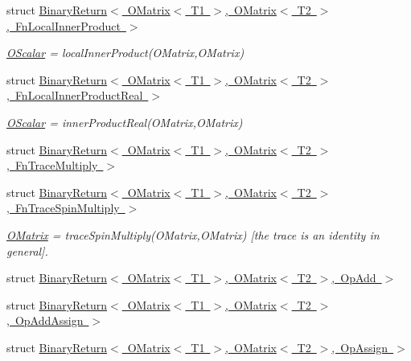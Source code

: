 \begin{DoxyCompactItemize}
struct \mbox{\hyperlink{structENSEM_1_1BinaryReturn_3_01OMatrix_3_01T1_01_4_00_01OMatrix_3_01T2_01_4_00_01FnLocalInnerProduct_01_4}{Binary\+Return$<$ O\+Matrix$<$ T1 $>$, O\+Matrix$<$ T2 $>$, Fn\+Local\+Inner\+Product $>$}}
\begin{DoxyCompactList}\small\item\em \mbox{\hyperlink{classENSEM_1_1OScalar}{O\+Scalar}} = local\+Inner\+Product(\+O\+Matrix,\+O\+Matrix) \end{DoxyCompactList}\item 
struct \mbox{\hyperlink{structENSEM_1_1BinaryReturn_3_01OMatrix_3_01T1_01_4_00_01OMatrix_3_01T2_01_4_00_01FnLocalInnerProductReal_01_4}{Binary\+Return$<$ O\+Matrix$<$ T1 $>$, O\+Matrix$<$ T2 $>$, Fn\+Local\+Inner\+Product\+Real $>$}}
\begin{DoxyCompactList}\small\item\em \mbox{\hyperlink{classENSEM_1_1OScalar}{O\+Scalar}} = inner\+Product\+Real(\+O\+Matrix,\+O\+Matrix) \end{DoxyCompactList}\item 
struct \mbox{\hyperlink{structENSEM_1_1BinaryReturn_3_01OMatrix_3_01T1_01_4_00_01OMatrix_3_01T2_01_4_00_01FnTraceMultiply_01_4}{Binary\+Return$<$ O\+Matrix$<$ T1 $>$, O\+Matrix$<$ T2 $>$, Fn\+Trace\+Multiply $>$}}
\item 
struct \mbox{\hyperlink{structENSEM_1_1BinaryReturn_3_01OMatrix_3_01T1_01_4_00_01OMatrix_3_01T2_01_4_00_01FnTraceSpinMultiply_01_4}{Binary\+Return$<$ O\+Matrix$<$ T1 $>$, O\+Matrix$<$ T2 $>$, Fn\+Trace\+Spin\+Multiply $>$}}
\begin{DoxyCompactList}\small\item\em \mbox{\hyperlink{classENSEM_1_1OMatrix}{O\+Matrix}} = trace\+Spin\+Multiply(\+O\+Matrix,\+O\+Matrix) \mbox{[}the trace is an identity in general\mbox{]}. \end{DoxyCompactList}\item 
struct \mbox{\hyperlink{structENSEM_1_1BinaryReturn_3_01OMatrix_3_01T1_01_4_00_01OMatrix_3_01T2_01_4_00_01OpAdd_01_4}{Binary\+Return$<$ O\+Matrix$<$ T1 $>$, O\+Matrix$<$ T2 $>$, Op\+Add $>$}}
\item 
struct \mbox{\hyperlink{structENSEM_1_1BinaryReturn_3_01OMatrix_3_01T1_01_4_00_01OMatrix_3_01T2_01_4_00_01OpAddAssign_01_4}{Binary\+Return$<$ O\+Matrix$<$ T1 $>$, O\+Matrix$<$ T2 $>$, Op\+Add\+Assign $>$}}
\item 
struct \mbox{\hyperlink{structENSEM_1_1BinaryReturn_3_01OMatrix_3_01T1_01_4_00_01OMatrix_3_01T2_01_4_00_01OpAssign_01_4}{Binary\+Return$<$ O\+Matrix$<$ T1 $>$, O\+Matrix$<$ T2 $>$, Op\+Assign $>$}}

\end{DoxyCompactItemize}
